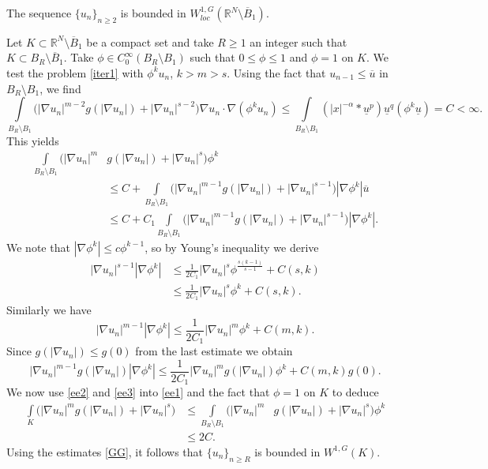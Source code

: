 \documentclass[leqno,12pt]{article}
\numberwithin{equation}{section}
\newcommand{\Ro}{\mathbb R^N\setminus \overline B_1}
\begin{document}
  The sequence $\{u_n\}_{n\geq 2}$ is bounded in $W^{1, G}_{loc}(\Ro)$. 


Let $K\subset \Ro$ be a compact set and take $R\geq 1$ an integer such that $K\subset B_R\setminus \overline B_1$. Take $\phi\in C_0^\infty(B_R\setminus B_1)$ such that $0\leq \phi\leq 1$ and $\phi=1$ on $K$. We test the problem \eqref{iter1} with $\phi^k u_n$, $k>m>s$. Using the fact that $u_{n-1}\leq \overline u$ in $B_R\setminus B_1$, we find  
$$
\int\limits_{B_R\setminus B_1}\Big(|\nabla u_n|^{m-2}g(|\nabla u_n|)+|\nabla u_n|^{s-2}\Big) \nabla u_n\cdot \nabla (\phi^k u_n) \leq  \int\limits_{B_R\setminus B_1}(|x|^{-\alpha}*\underline u^p)\underline u^q (\phi^k \underline u)=C<\infty.
$$
This yields
\begin{equation}\label{ee1}
\begin{aligned}
\int\limits_{B_R\setminus B_1}\Big(|\nabla u_n|^{m} & g(|\nabla u_n|) +|\nabla u_n|^{s}\Big)  \phi^k \\
&\leq  C+\int\limits_{B_R\setminus B_1}\Big(|\nabla u_n|^{m-1}g(|\nabla u_n|)+|\nabla u_n|^{s-1}\Big)  |\nabla \phi^k| \overline u\\
&\leq  C+C_1\int\limits_{B_R\setminus B_1}\Big(|\nabla u_n|^{m-1}g(|\nabla u_n|)+|\nabla u_n|^{s-1}\Big)  |\nabla \phi^k|.
\end{aligned}
\end{equation}
We note that $|\nabla \phi^k|\leq c\phi^{k-1}$, so by Young's inequality we derive
\begin{equation}\label{ee2}
\begin{aligned}
|\nabla u_n|^{s-1}  |\nabla \phi^k| & \leq \frac{1}{2C_1} |\nabla u_n|^{s} \phi^{\frac{s(k-1)}{s-1}}+C(s,k)\\
& \leq \frac{1}{2C_1} |\nabla u_n|^{s} \phi^{k}+C(s,k).
\end{aligned}
\end{equation}
Similarly we have 
$$
|\nabla u_n|^{m-1}  |\nabla \phi^k| \leq \frac{1}{2C_1} |\nabla u_n|^{m} \phi^{k}+C(m,k).
$$
Since $g(|\nabla u_n|)\leq g(0)$ from the last estimate we obtain
\begin{equation}\label{ee3}
|\nabla u_n|^{m-1} g(|\nabla u_n|) |\nabla \phi^k| \leq \frac{1}{2C_1} |\nabla u_n|^{m} g(|\nabla u_n|)\phi^{k}+C(m,k)g(0).
\end{equation}
We now use \eqref{ee2} and \eqref{ee3} into \eqref{ee1} and the fact that $\phi=1$ on $K$ to deduce 
\begin{equation}\label{ee4}
\begin{aligned}
\int\limits_{K}\Big(|\nabla u_n|^{m}  g(|\nabla u_n|) +|\nabla u_n|^{s}\Big)  &\leq \int\limits_{B_R\setminus B_1}\Big(|\nabla u_n|^{m} & g(|\nabla u_n|) +|\nabla u_n|^{s}\Big)  \phi^k \\
&\leq  2C.
\end{aligned}
\end{equation}
Using the estimates \eqref{GG}, it follows that $\{u_n\}_{n\geq R}$ is bounded in $W^{1, G}(K)$.
\end{document}
